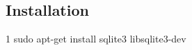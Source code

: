 \subsection*{Installation}


\begin{DoxyCode}
1 sudo apt-get install sqlite3 libsqlite3-dev
\end{DoxyCode}
 